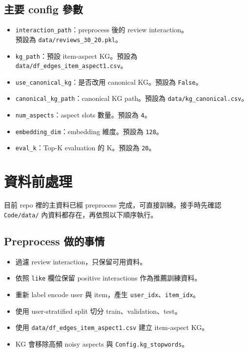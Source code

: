 \documentclass[12pt,a4paper,fontset=none]{ctexart}
\newcommand{\cmd}[1]{\texttt{#1}}
\begin{document}
\subsection{主要 config 參數}

\begin{itemize}
  \item \cmd{interaction\_path}：preprocess 後的 review interaction。\\
  預設為
  \cmd{data/reviews\_30\_20.pkl}。
  \item \cmd{kg\_path}：預設 item-aspect KG。預設為 \cmd{data/df\_edges\_item\_aspect1.csv}。
  \item \cmd{use\_canonical\_kg}：是否改用 canonical KG。預設為 \cmd{False}。
  \item \cmd{canonical\_kg\_path}：canonical KG path。預設為 \cmd{data/kg\_canonical.csv}。
  \item \cmd{num\_aspects}：aspect slots 數量。預設為 \cmd{4}。
  \item \cmd{embedding\_dim}：embedding 維度。預設為 \cmd{128}。
  \item \cmd{eval\_k}：Top-K evaluation 的 K。預設為 \cmd{20}。
\end{itemize}

\section{資料前處理}

目前 repo 裡的主資料已經 preprocess 完成，可直接訓練。接手時先確認 \cmd{Code/data/} 內資料都存在，再依照以下順序執行。

\subsection{Preprocess 做的事情}

\begin{itemize}
  \item 過濾 review interaction，只保留可用資料。
  \item 依照 \cmd{like} 欄位保留 positive interactions 作為推薦訓練資料。
  \item 重新 label encode user 與 item，產生 \cmd{user\_idx}、\cmd{item\_idx}。
  \item 使用 user-stratified split 切分 train、validation、test。
  \item 使用 \cmd{data/df\_edges\_item\_aspect1.csv} 建立 item-aspect KG。
  \item KG 會移除高頻 noisy aspects 與 \cmd{Config.kg\_stopwords}。
\end{itemize}
\end{document}
